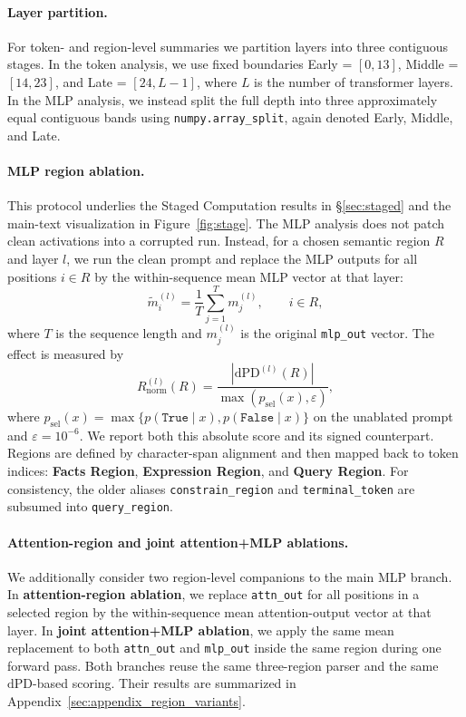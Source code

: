 \documentclass[11pt]{article}
\begin{document}
\paragraph{Layer partition.}
For token- and region-level summaries we partition layers into three contiguous stages. In the token analysis, we use fixed boundaries Early = $[0,13]$, Middle = $[14,23]$, and Late = $[24, L-1]$, where $L$ is the number of transformer layers. In the MLP analysis, we instead split the full depth into three approximately equal contiguous bands using \texttt{numpy.array\_split}, again denoted Early, Middle, and Late.

\paragraph{MLP region ablation.}
This protocol underlies the Staged Computation results in §\ref{sec:staged} and the main-text visualization in Figure~\ref{fig:stage}.
The MLP analysis does not patch clean activations into a corrupted run. Instead, for a chosen semantic region $R$ and layer $l$, we run the clean prompt and replace the MLP outputs for all positions $i \in R$ by the within-sequence mean MLP vector at that layer:
\begin{equation}
\tilde{m}^{(l)}_i = \frac{1}{T}\sum_{j=1}^{T} m^{(l)}_j, \qquad i \in R,
\end{equation}
where $T$ is the sequence length and $m^{(l)}_j$ is the original \texttt{mlp\_out} vector. The effect is measured by
\begin{equation}
R_{\mathrm{norm}}^{(l)}(R) = \frac{|\mathrm{dPD}^{(l)}(R)|}{\max\left(p_{\mathrm{sel}}(x), \varepsilon\right)},
\end{equation}
where $p_{\mathrm{sel}}(x)=\max\{p(\texttt{True}\mid x), p(\texttt{False}\mid x)\}$ on the unablated prompt and $\varepsilon=10^{-6}$. We report both this absolute score and its signed counterpart. Regions are defined by character-span alignment and then mapped back to token indices: \textbf{Facts Region}, \textbf{Expression Region}, and \textbf{Query Region}. For consistency, the older aliases \texttt{constrain\_region} and \texttt{terminal\_token} are subsumed into \texttt{query\_region}.

\paragraph{Attention-region and joint attention+MLP ablations.}
We additionally consider two region-level companions to the main MLP branch. In \textbf{attention-region ablation}, we replace \texttt{attn\_out} for all positions in a selected region by the within-sequence mean attention-output vector at that layer. In \textbf{joint attention+MLP ablation}, we apply the same mean replacement to both \texttt{attn\_out} and \texttt{mlp\_out} inside the same region during one forward pass. Both branches reuse the same three-region parser and the same $\mathrm{dPD}$-based scoring. Their results are summarized in Appendix~\ref{sec:appendix_region_variants}.
\end{document}
